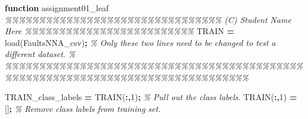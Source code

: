 \documentclass[
]{book}
\newenvironment{Shaded}{\begin{snugshade}}{\end{snugshade}}
\newcommand{\BuiltInTok}[1]{#1}
\newcommand{\CommentTok}[1]{\textcolor[rgb]{0.56,0.35,0.01}{\textit{#1}}}
\newcommand{\ControlFlowTok}[1]{\textcolor[rgb]{0.13,0.29,0.53}{\textbf{#1}}}
\newcommand{\FloatTok}[1]{\textcolor[rgb]{0.00,0.00,0.81}{#1}}
\newcommand{\NormalTok}[1]{#1}
\newcommand{\OperatorTok}[1]{\textcolor[rgb]{0.81,0.36,0.00}{\textbf{#1}}}
\newcommand{\StringTok}[1]{\textcolor[rgb]{0.31,0.60,0.02}{#1}}
\begin{document}
\begin{Shaded}
\begin{Highlighting}[]
\ControlFlowTok{function}\NormalTok{ assignment01\_leaf}
\CommentTok{\%\%\%\%\%\%\%\%\%\%\%\%\%\%\%\%\%\%\%\%\%\%\%\%\%\%\%\%\%\%\%\% (C) Student Name Here \%\%\%\%\%\%\%\%\%\%\%\%\%\%\%\%\%\%\%\%\%\%\%\%\%}
\NormalTok{TRAIN }\OperatorTok{=} \BuiltInTok{load}\NormalTok{(}\StringTok{\textquotesingle{}FaultsNNA\_csv\textquotesingle{}}\NormalTok{)}\OperatorTok{;} \CommentTok{\% Only these two lines need to be changed to test a different dataset. \% }
\CommentTok{\%\%\%\%\%\%\%\%\%\%\%\%\%\%\%\%\%\%\%\%\%\%\%\%\%\%\%\%\%\%\%\%\%\%\%\%\%\%\%\%\%\%\%\%\%\%\%\%\%\%\%\%\%\%\%\%\%\%\%\%\%\%\%\%\%\%\%\%\%\%\%\%\%\%\%\%\%\%\%\%}

\NormalTok{TRAIN\_class\_labels }\OperatorTok{=}\NormalTok{ TRAIN(}\OperatorTok{:,}\FloatTok{1}\NormalTok{)}\OperatorTok{;}    \CommentTok{\% Pull out the class labels.}
\NormalTok{TRAIN(}\OperatorTok{:,}\FloatTok{1}\NormalTok{) }\OperatorTok{=}\NormalTok{ []}\OperatorTok{;}    \CommentTok{\% Remove class labels from training set.}


\end{Highlighting}
\end{Shaded}
\end{document}
